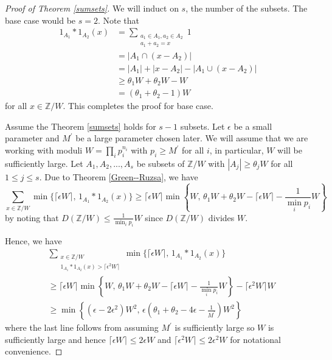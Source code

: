 \documentclass[11pt]{amsart}
\theoremstyle{plain} %
\theoremstyle{remark}
\numberwithin{equation}{section}
\newcommand{\Z}{\mathbb{Z}}
\begin{document}
\begin{proof}[Proof of Theorem \ref{sumsets}]
    We will induct on $s$, the number of the subsets. The base case would be $s=2$. Note that
    \begin{equation*}
        \begin{split}
            1_{A_1}*1_{A_2}(x)&=\sum_{\substack{a_1\in A_1,a_2\in A_2\\a_1+a_2=x}}1\\
            &=|A_1\cap(x-A_2)|\\
            &=|A_1|+|x-A_2|-|A_1\cup(x-A_2)|\\
            &\geq \theta_1W+\theta_2W-W\\
            &=(\theta_1+\theta_2-1)W
        \end{split}
    \end{equation*}
    for all $x\in \Z/W$. This completes the proof for base case.

    Assume the Theorem \ref{sumsets} holds for $s-1$ subsets. Let $\epsilon$ be a small parameter and $M^{\prime}$ be a large parameter chosen later. We will assume that we are working with moduli $W=\prod_i p_i^{n_i}$ with $p_i\geq M^{\prime}$ for all $i$, in particular, $W$ will be sufficiently large. Let $A_1,A_2,...,A_s$ be subsets of $\Z/W$ with $|A_j|\geq \theta_j W$ for all $1\leq j\leq s$. Due to Theorem \ref{Green--Ruzsa}, we have
    \begin{equation*}
        \sum_{x\in \Z/W} \min \{\lceil \epsilon W\rceil,\,1_{A_1}*1_{A_2}(x)\}\geq \lceil \epsilon W\rceil\min \left\{W,\,\theta_1 W+\theta_2 W-\lceil \epsilon W\rceil-\frac{1}{\min_i p_i}W\right\}
    \end{equation*}
    by noting that $D(\Z/W)\leq \frac{1}{\min_i p_i}W$ since $D(\Z/W)$ divides $W$.

    Hence, we have
    \begin{equation*}
        \begin{split}
            &\sum_{\substack{x\in \Z/W\\1_{A_1}*1_{A_2}(x)>\lceil \epsilon^2 W\rceil}} \min \{\lceil \epsilon W\rceil,\,1_{A_1}*1_{A_2}(x)\}\\
            &\geq \lceil \epsilon W\rceil\min \left\{W,\,\theta_1 W+\theta_2 W-\lceil \epsilon W\rceil-\frac{1}{\min_i p_i}W\right\}-\lceil \epsilon^2 W\rceil W\\
            &\geq \min\left\{(\epsilon-2\epsilon^2)W^2,\,\epsilon\left(\theta_1+\theta_2-4\epsilon-\frac{1}{M^{\prime}}\right)W^2\right\}
        \end{split}
    \end{equation*}
    where the last line follows from assuming $M^{\prime}$ is sufficiently large so $W$ is sufficiently large and hence $\lceil \epsilon W\rceil\leq 2\epsilon W$ and $\lceil \epsilon^2 W\rceil\leq 2\epsilon^2 W$ for notational convenience.


\end{proof}
\end{document}
